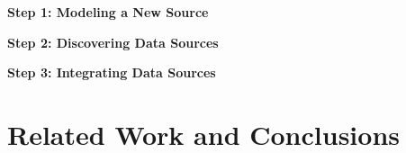 \documentclass[runningheads,a4paper]{llncs}
\begin{document}
\textbf{Step 1: Modeling a New Source} 


\textbf{Step 2: Discovering Data Sources} 


\textbf{Step 3: Integrating Data Sources} 

\section{Related Work and Conclusions} 



\vspace{-5mm}


\end{document}

